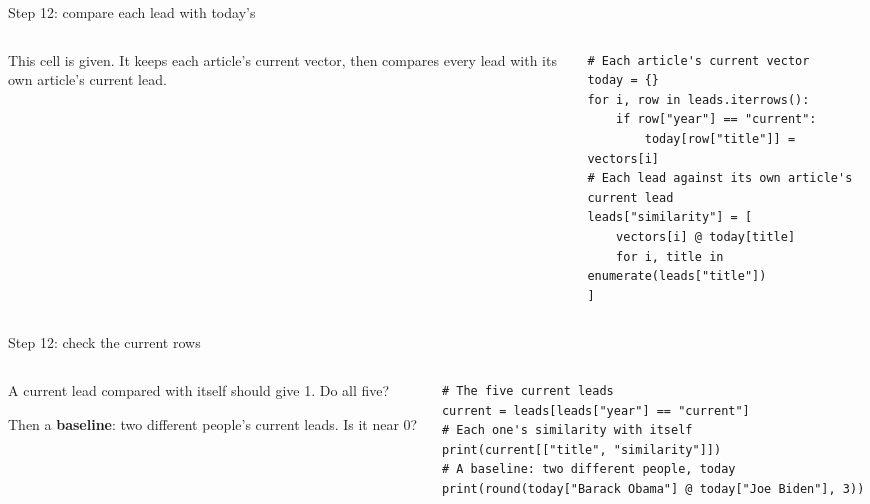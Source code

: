 \documentclass[9pt,aspectratio=169]{beamer}
\begin{document}
\begin{frame}[fragile]{Step 12: compare each lead with today's}
    \begin{columns}[T]
        \begin{column}{0.37\textwidth}
            This cell is given. It keeps each article's current vector, then compares every lead with its own article's current lead.
        \end{column}
        \begin{column}{0.6\textwidth}
\begin{lstlisting}
# Each article's current vector
today = {}
for i, row in leads.iterrows():
    if row["year"] == "current":
        today[row["title"]] = vectors[i]
# Each lead against its own article's current lead
leads["similarity"] = [
    vectors[i] @ today[title]
    for i, title in enumerate(leads["title"])
]
\end{lstlisting}
        \end{column}
    \end{columns}
\end{frame}

\begin{frame}[fragile]{Step 12: check the current rows}
    \begin{columns}[T]
        \begin{column}{0.37\textwidth}
            A current lead compared with itself should give 1. Do all five?

            \medskip
            Then a \textbf{baseline}: two different people's current leads. Is it near 0?
        \end{column}
        \begin{column}{0.6\textwidth}
\begin{lstlisting}
# The five current leads
current = leads[leads["year"] == "current"]
# Each one's similarity with itself
print(current[["title", "similarity"]])
# A baseline: two different people, today
print(round(today["Barack Obama"] @ today["Joe Biden"], 3))
\end{lstlisting}
        \end{column}
    \end{columns}
\end{frame}
\end{document}
